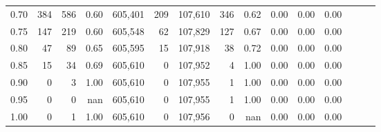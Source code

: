 \begin{tabular}{rrrrrrrrrrrrrrr}
0.70 &      384 &     586 &  0.60 &  605,401 &      209 &  107,610 &      346 &  0.62 &  0.00 &  0.00 &      0.00 \\
0.75 &      147 &     219 &  0.60 &  605,548 &       62 &  107,829 &      127 &  0.67 &  0.00 &  0.00 &      0.00 \\
0.80 &       47 &      89 &  0.65 &  605,595 &       15 &  107,918 &       38 &  0.72 &  0.00 &  0.00 &      0.00 \\
0.85 &       15 &      34 &  0.69 &  605,610 &        0 &  107,952 &        4 &  1.00 &  0.00 &  0.00 &      0.00 \\
0.90 &        0 &       3 &  1.00 &  605,610 &        0 &  107,955 &        1 &  1.00 &  0.00 &  0.00 &      0.00 \\
0.95 &        0 &       0 &   nan &  605,610 &        0 &  107,955 &        1 &  1.00 &  0.00 &  0.00 &      0.00 \\
1.00 &        0 &       1 &  1.00 &  605,610 &        0 &  107,956 &        0 &   nan &  0.00 &  0.00 &      0.00 \\
\bottomrule
\end{tabular}

